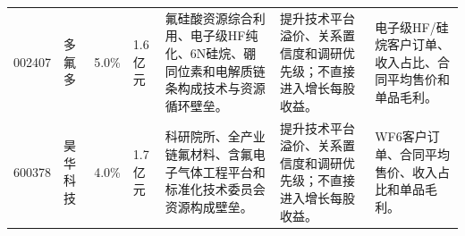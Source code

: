 \begin{exhibitbox}[研发与技术资产强度（1）]
\begin{tabularx}{\exhibitboxwidth}{L{0.8cm} L{1.1cm} L{1.0cm} L{1.0cm} X X X}
002407 & 多氟多 & 5.0\% & 1.6亿元 & 氟硅酸资源综合利用、电子级HF纯化、6N硅烷、硼同位素和电解质链条构成技术与资源循环壁垒。 & 提升技术平台溢价、关系置信度和调研优先级；不直接进入增长每股收益。 & 电子级HF/硅烷客户订单、收入占比、合同平均售价和单品毛利。 \\
600378 & 昊华科技 & 4.0\% & 1.7亿元 & 科研院所、全产业链氟材料、含氟电子气体工程平台和标准化技术委员会资源构成壁垒。 & 提升技术平台溢价、关系置信度和调研优先级；不直接进入增长每股收益。 & WF6客户订单、合同平均售价、收入占比和单品毛利。 \\
\bottomrule
\end{tabularx}
\end{exhibitbox}

